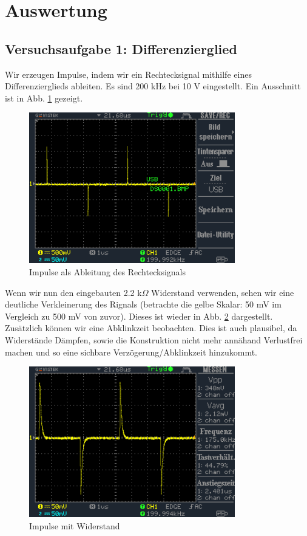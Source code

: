\documentclass[a4paper,10pt]{article}
\numberwithin{equation}{section}
\begin{document}
\newpage
\section{Auswertung}

\subsection{Versuchsaufgabe 1: Differenzierglied}
Wir erzeugen Impulse, indem wir ein Rechtecksignal mithilfe eines Differenzierglieds ableiten. Es sind 200 kHz bei 10 V eingestellt. Ein Ausschnitt ist in Abb. \ref{fig:1.1} gezeigt.
\begin{figure}[h]
        \centering
        \includegraphics[width=0.8\textwidth]{data/DS0001.BMP.png}
        \caption{Impulse als Ableitung des Rechtecksignals}
		\label{fig:1.1}
\end{figure}
Wenn wir nun den eingebauten 2.2 k$\Omega$ Widerstand verwenden, sehen wir eine deutliche Verkleinerung des Rignals (betrachte die gelbe Skalar: 50 mV im Vergleich zu 500 mV von zuvor). Dieses ist wieder in Abb. \ref{fig:1.2} dargestellt. Zusätzlich können wir eine Abklinkzeit beobachten. Dies ist auch plausibel, da Widerstände Dämpfen, sowie die Konstruktion nicht mehr annähand Verlustfrei machen und so eine sichbare Verzögerung/Abklinkzeit hinzukommt.
\begin{figure}[h]
        \centering
        \includegraphics[width=0.8\textwidth]{data/DS0003.BMP.png}
        \caption{Impulse mit Widerstand}
		\label{fig:1.2}
\end{figure}
\end{document}
